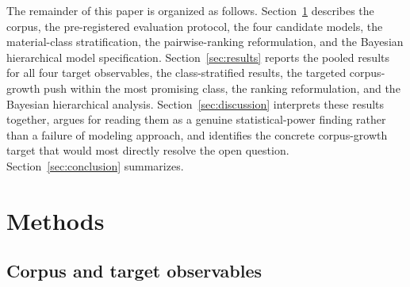 \documentclass[aip,amsmath,amssymb,reprint]{revtex4-1}
\begin{document}
The remainder of this paper is organized as follows.
Section~\ref{sec:methods} describes the corpus, the pre-registered
evaluation protocol, the four candidate models, the material-class
stratification, the pairwise-ranking reformulation, and the Bayesian
hierarchical model specification. Section~\ref{sec:results} reports
the pooled results for all four target observables, the
class-stratified results, the targeted corpus-growth push within the
most promising class, the ranking reformulation, and the Bayesian
hierarchical analysis. Section~\ref{sec:discussion} interprets these
results together, argues for reading them as a genuine
statistical-power finding rather than a failure of modeling
approach, and identifies the concrete corpus-growth target that would
most directly resolve the open question. Section~\ref{sec:conclusion}
summarizes.

\section{Methods}
\label{sec:methods}

\subsection{Corpus and target observables}
\label{ssec:corpus}
\end{document}
